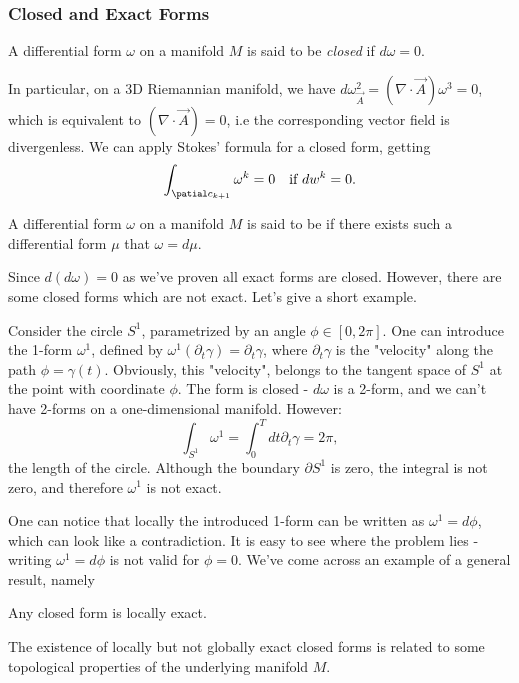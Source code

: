 \subsubsection{Closed and Exact Forms}
\begin{definition}
  A differential form $\omega$ on a manifold $M$ is said to be \textit{closed}
  if $d\omega = 0.$
\end{definition}
In particular, on a 3D Riemannian manifold, we have $d\omega^2_{\vec{A}}
= \left(\nabla\cdot\vec{A}\right)\omega^3 = 0$, which is equivalent to
$\left(\nabla\cdot\vec{A}\right) = 0$, i.e the corresponding vector field is
divergenless. We can apply Stokes' formula for a closed form, getting
\begin{equation}
  \int_{\patial c_{k+1}}{\omega^k} = 0\quad\text{if }dw^k=0.
  \label{eq:stokesclosedform}
\end{equation}
\begin{definition}
  A  differential form $\omega$ on a manifold $M$ is said to be 
  if there exists such a differential form $\mu$ that $\omega = d\mu$.
\end{definition}
Since $d(d\omega) = 0$ as we've proven all exact forms are closed. However,
there are some closed forms which are not exact. Let's give a short example.
\begin{example}
  Consider the circle $S^1$, parametrized by an angle $\phi\in [0,2\pi]$. One
  can introduce the 1-form $\omega^1$, defined by
  $\omega^1(\partial_t\gamma)=\partial_t\gamma$, where $\partial_t\gamma$ is
  the "velocity" along the path $\phi = \gamma(t)$. Obviously, this "velocity",
  belongs to the tangent space of $S^1$ at the point with coordinate $\phi$.
  The form is closed - $d\omega$ is a 2-form, and we can't have 2-forms on
  a one-dimensional manifold. However:
  \begin{equation}
    \int_{S^1}\omega^1 = \int_{0}^T{dt \partial_t\gamma} = 2\pi,
  \end{equation}
the length of the circle. Although the boundary $\partial S^1$ is zero, the
integral is not zero, and therefore $\omega^1$ is not exact.
\end{example}
\par One can notice that locally the introduced 1-form can be written as
$\omega^1 = d\phi$, which can look like a contradiction. It is easy to see
where the problem lies - writing $\omega^1 = d\phi$ is not valid for $\phi=0$.
We've come across an example of a general result, namely
\begin{theorem}
  Any closed form is locally exact.
\end{theorem}
The existence of locally but not globally exact closed forms is related to some
topological properties of the underlying manifold $M$.

